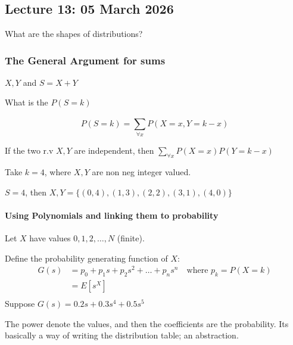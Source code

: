 \documentclass{report}
\begin{document}
\chapter{}
\section{Lecture 13: 05 March 2026}
What are the shapes of distributions? 

\subsection{The General Argument for sums}

$ X,Y  $ and $ S = X+Y $ 

What is the $ P(S=k) $

\[
P(S=k) = \sum_{\forall x}^{}P(X=x, Y=k-x)
\]

If the two r.v $ X,Y $ are independent, then $ \sum_{\forall x}^{}P(X=x)P(Y=k-x) $ 

\noindent
Take $ k=4 $, where $ X,Y $ are non neg integer valued. 

$ S=4 $, then $ X,Y = \{(0,4), (1,3), (2,2), (3,1), (4,0)\} $  

\subsubsection{Using Polynomials and linking them to probability}

Let $ X $ have values $ 0,1,2,\dots, N $ (finite). 

\noindent
Define the probability generating function of $ X $:
\begin{align*}
	G(s) &= p_{0} + p_{1}s + p_{2}s^{2} + \dots + p_{n}s^{n} \quad \text{where } p_{k} = P(X=k) \\ 
	&= E[s^{X}] \\
\end{align*}
\noindent
Suppose $ G(s) = 0.2s + 0.3s^{4} + 0.5s^{5} $ 

The power denote the values, and then the coefficients are the probability. Its basically a way of writing the distribution table; an abstraction. 

\end{document}
